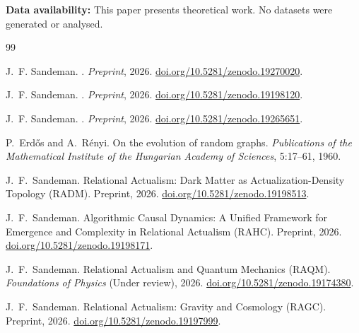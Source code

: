 \documentclass[11pt,a4paper]{article}
\theoremstyle{plain}
\theoremstyle{definition}
\theoremstyle{remark}
\begin{document}
\textbf{Data availability:} This paper presents theoretical work. No datasets
were generated or analysed.


\begin{thebibliography}{99}

J.~F. Sandeman.
.
\newblock \textit{Preprint}, 2026.
\newblock \href{https://doi.org/10.5281/zenodo.19270020}{doi.org/10.5281/zenodo.19270020}.


J.~F. Sandeman.
.
\newblock \textit{Preprint}, 2026.
\newblock \href{https://doi.org/10.5281/zenodo.19198120}{doi.org/10.5281/zenodo.19198120}.


J.~F. Sandeman.
.
\newblock \textit{Preprint}, 2026.
\newblock \href{https://doi.org/10.5281/zenodo.19265651}{doi.org/10.5281/zenodo.19265651}.


P.~Erd\H{o}s and A.~R\'{e}nyi.
\newblock On the evolution of random graphs.
\newblock \emph{Publications of the Mathematical Institute of the Hungarian
  Academy of Sciences}, 5:17--61, 1960.

J.~F.~Sandeman.
\newblock Relational Actualism: Dark Matter as Actualization-Density Topology ({RADM}).
\newblock Preprint, 2026.
\newblock \href{https://doi.org/10.5281/zenodo.19198513}{doi.org/10.5281/zenodo.19198513}.

J.~F.~Sandeman.
\newblock Algorithmic Causal Dynamics: A Unified Framework for Emergence and
  Complexity in Relational Actualism ({RAHC}).
\newblock Preprint, 2026.
\newblock \href{https://doi.org/10.5281/zenodo.19198171}{doi.org/10.5281/zenodo.19198171}.

J.~F.~Sandeman.
\newblock Relational Actualism and Quantum Mechanics ({RAQM}).
\newblock \textit{Foundations of Physics} (Under review), 2026.
\newblock \href{https://doi.org/10.5281/zenodo.19174380}{doi.org/10.5281/zenodo.19174380}.

J.~F.~Sandeman.
\newblock Relational Actualism: Gravity and Cosmology ({RAGC}).
\newblock Preprint, 2026.
\newblock \href{https://doi.org/10.5281/zenodo.19197999}{doi.org/10.5281/zenodo.19197999}.


\end{thebibliography}
\end{document}
